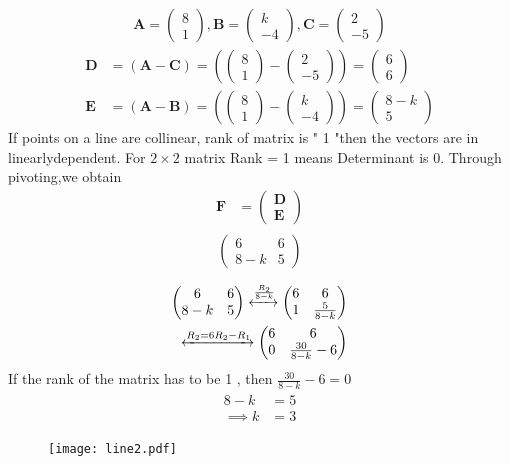 \documentclass[journal,10pt,twocolumn]{article}
\newcommand{\myvec}[1]{\ensuremath{\begin{pmatrix}#1\end{pmatrix}}}
\let\vec\mathbf
\providecommand{\brak}[1]{\ensuremath{\left(#1\right)}}
\let\vec\mathbf
\begin{document}
\begin{enumerate}
\begin{align}  
\vec{A}=\myvec{8 \\ 1},
\vec{B}=\myvec{k \\ -4},
\vec{C}=\myvec{2 \\ -5}
\end{align}
\begin{align}  
 \vec{D} &=\brak{\vec{A}-\vec{C}} = \brak{\myvec{8 \\1 } - \myvec{2 \\-5 } } = \myvec{6 \\ 6 }\\
\vec{E} &= \brak{\vec{A}-\vec{B}} = \brak{\myvec{8 \\ 1 } - \myvec{k \\-4 } } = \myvec{8-k \\5}
\end{align}
If points on a line  are  collinear, rank of matrix is " 1 "then the vectors are in linearlydependent.
For $2\times2$ matrix Rank = 1 means Determinant is 0.
Through pivoting,we obtain
\begin{align}
\vec{F} &={\myvec{\vec{D}\\ \vec{E}}}
\end{align}
\begin{align}
\begin{split}
\myvec{
6 & 6
 \\
8-k & 5
}
\end{split}
\end{align}
\begin{align}
\label{eq:chem_balance_mat_row}
\myvec{
6 & 6
\\
8-k & 5
}
 \xleftrightarrow[]{\frac{R_2}{8-k}}
\myvec{
6 & 6
\\
1 & \frac{5}{8-k}
}
\\
\xleftrightarrow[]{R_2 = 6R_2-R_1}
\myvec{
6 & 6
\\
0 & \frac{30}{8-k}-6
}
\end{align}
If the rank of the matrix has to be 1 , then 
$\frac{30}{8-k}-6 =0$
\begin{align}
\begin{split}
 8-k &=5
\\
\implies k &=3
\end{split}
\end{align}

\begin{figure}[h]
	  \centering 
	  \texttt{[image: line2.pdf]}
	  \caption{}
	  \label{fig:line2.png}
	  \end{figure}
\end{enumerate} 
\end{document}
